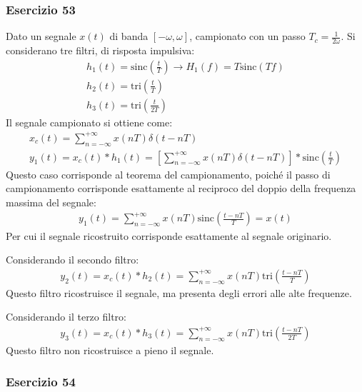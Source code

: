 \documentclass{article}
\newcommand{\sinc}{\mathrm{sinc}}
\newcommand{\tri}{\mathrm{tri}}
\begin{document}
\subsubsection*{Esercizio 53}

Dato un segnale $x(t)$ di banda $[-\omega,\omega]$, campionato con un passo $T_c=\displaystyle\frac{1}{2\omega}$. Si considerano tre filtri, di risposta impulsiva:
\begin{gather*}
    h_1(t)=\sinc\left(\displaystyle\frac{t}{T}\right)\to H_1(f)=T\sinc(Tf)\\
    h_2(t)=\tri \left(\displaystyle\frac{t}{T}\right)\\
    h_3(t)=\tri \left(\displaystyle\frac{t}{2T}\right)
\end{gather*}
Il segnale campionato si ottiene come:
\begin{gather*}
    x_c(t)=\displaystyle\sum_{n=-\infty}^{+\infty}x(nT)\delta(t-nT)\\
    y_1(t)=x_c(t)*h_1(t)=\left[\displaystyle\sum_{n=-\infty}^{+\infty}x(nT)\delta(t-nT)\right]*\sinc\left(\frac{t}{T}\right)
\end{gather*}
Questo caso corrisponde al teorema del campionamento, poiché il passo di campionamento corrisponde esattamente al reciproco del doppio della frequenza massima del segnale:
\begin{gather}
    y_1(t)=\displaystyle\sum_{n=-\infty}^{+\infty}x(nT)\sinc\left(\frac{t-nT}{T}\right)=x(t)
\end{gather}
Per cui il segnale ricostruito corrisponde esattamente al segnale originario. 

Considerando il secondo filtro:
\begin{gather}
    y_2(t)=x_c(t)*h_2(t)=\displaystyle\sum_{n=-\infty}^{+\infty}x(nT)\tri \left(\frac{t-nT}{T}\right)
\end{gather}
Questo filtro ricostruisce il segnale, ma presenta degli errori alle alte frequenze. 

Considerando il terzo filtro:
\begin{gather}
    y_3(t)=x_c(t)*h_3(t)=\displaystyle\sum_{n=-\infty}^{+\infty}x(nT)\tri \left(\frac{t-nT}{2T}\right)
\end{gather}
Questo filtro non ricostruisce a pieno il segnale. 

\subsubsection*{Esercizio 54}
\end{document}
